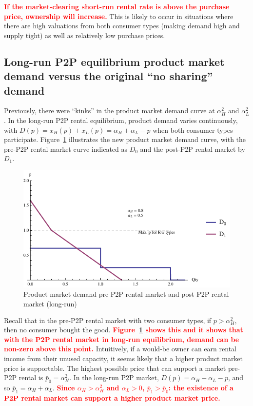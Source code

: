 \documentclass[11pt]{article}
\newcommand{\important}[1]{\textcolor{red}{\textbf{#1}}}
\newcommand{\important}[1]{#1}
\begin{document}
\important{If the market-clearing short-run rental rate is above the purchase price, ownership will increase.}
This is likely to occur in situations where there are high valuations from both consumer types (making demand high and supply tight) as well as relatively low purchase prices. 

\subsection{Long-run P2P equilibrium product market demand versus the original ``no sharing'' demand} 
Previously, there were ``kinks'' in the product market demand curve at $\alpha_H^2$ and $\alpha_L^2$. 
In the long-run P2P rental equilibrium, product demand varies continuously, with $D(p) = x_H(p) + x_L(p) = \alpha_H + \alpha_L - p$ when both consumer-types participate. 
Figure~\ref{fig:demand} illustrates the new product market demand curve, with the pre-P2P rental market curve indicated as $D_0$ and the post-P2P rental market by $D_1$. 

\begin{figure}
\caption{Product market demand pre-P2P rental market and post-P2P rental market (long-run)}
\label{fig:demand} 
\centering
\includegraphics[scale = 1]{./diagrams/p2plr_demand.pdf}
\end{figure} 

Recall that in the pre-P2P rental market with two consumer types, if $p > \alpha_H^2$, then no consumer bought the good. 
\important{Figure~\ref{fig:demand} shows this and it shows that with the P2P rental market in long-run equilibrium, demand can be non-zero above this point.}  
Intuitively, if a would-be owner can earn rental income from their unused capacity, it seems likely that a higher product market price is supportable. 
The highest possible price that can support a market pre-P2P rental is $\bar{p}_0 = \alpha_H^2$.  
In the long-run P2P market, $D(p) = \alpha_H + \alpha_L - p$, and so $\bar{p}_{1} = \alpha_H + \alpha_L$. 
\important{Since $\alpha_H > \alpha_H^2$ and $\alpha_L > 0$, $\bar{p}_1 > \bar{p}_0$: the existence of a P2P rental market can support a higher product market price.} 
\end{document}
